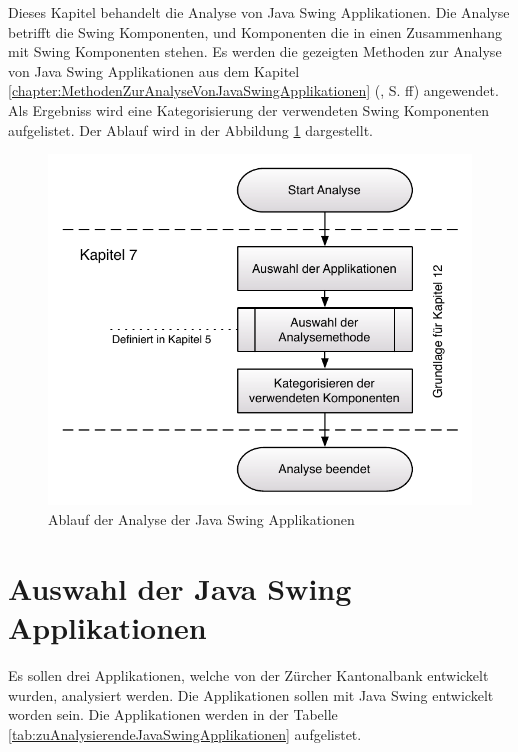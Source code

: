   Dieses Kapitel behandelt die Analyse von Java Swing Applikationen. Die
  Analyse betrifft die Swing Komponenten, und Komponenten die in einen
  Zusammenhang mit Swing Komponenten stehen. Es werden die gezeigten
  Methoden zur Analyse von Java Swing Applikationen aus dem Kapitel 
  \ref{chapter:MethodenZurAnalyseVonJavaSwingApplikationen}
  (, S.
  \pageref{chapter:MethodenZurAnalyseVonJavaSwingApplikationen}ff) angewendet.
  Als Ergebniss wird eine Kategorisierung der verwendeten Swing Komponenten
  aufgelistet. Der Ablauf wird in der Abbildung
  \ref{img:kompletteApplikationsAnalyse} dargestellt.
  \newline
    
  \begin{figure}[htb]
    \begin{center}
      \includegraphics[width=\textwidth]{./image/kompletteApplikationsAnalyse.pdf}
      \caption{Ablauf der Analyse der Java Swing Applikationen}
      \label{img:kompletteApplikationsAnalyse}
    \end{center}
  \end{figure}
  
  \section{Auswahl der Java Swing Applikationen}
  
  Es sollen drei Applikationen, welche von der Zürcher Kantonalbank entwickelt
  wurden, analysiert werden. Die Applikationen sollen mit Java Swing entwickelt
  worden sein. Die Applikationen werden in der Tabelle
  \ref{tab:zuAnalysierendeJavaSwingApplikationen} aufgelistet.
  \newline
  
